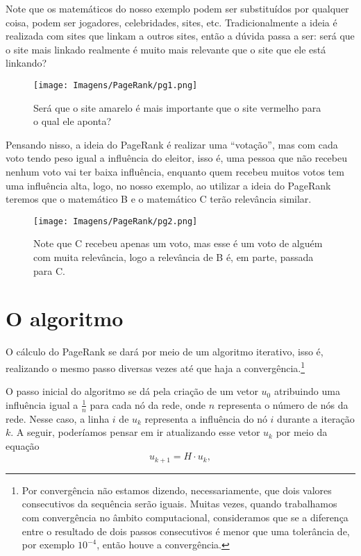 \documentclass{article}
\begin{document}
Note que os matemáticos do nosso exemplo podem ser substituídos por qualquer coisa, podem ser jogadores, celebridades, sites, etc. Tradicionalmente a ideia é realizada com sites que linkam a outros sites, então a dúvida passa a ser: será que o site mais linkado realmente é muito mais relevante que o site que ele está linkando?
\begin{figure}[H]
    \centering
    \texttt{[image: Imagens/PageRank/pg1.png]}
    \caption{Será que o site amarelo é mais importante que o site vermelho para o qual ele aponta?}
\end{figure}

Pensando nisso, a ideia do PageRank é realizar uma ``votação'', mas com cada voto tendo peso igual a influência do eleitor, isso é, uma pessoa que não recebeu nenhum voto vai ter baixa influência, enquanto quem recebeu muitos votos tem uma influência alta, logo, no nosso exemplo, ao utilizar a ideia do PageRank teremos que o matemático B e o matemático C terão relevância similar.
\begin{figure}[H]
    \centering
    \texttt{[image: Imagens/PageRank/pg2.png]}
    \caption{Note que C recebeu apenas um voto, mas esse é um voto de alguém com muita relevância, logo a relevância de B é, em parte, passada para C.}
\end{figure}

\section{O algoritmo}

O cálculo do PageRank se dará por meio de um algoritmo iterativo, isso é, realizando o mesmo passo diversas vezes até que haja a convergência.\footnote{Por convergência não estamos dizendo, necessariamente, que dois valores consecutivos da sequência serão iguais. Muitas vezes, quando trabalhamos com convergência no âmbito computacional, consideramos que se a diferença entre o resultado de dois passos consecutivos é menor que uma tolerância de, por exemplo $10^{-4}$, então houve a convergência.}

O passo inicial do algoritmo se dá pela criação de um vetor $u_0$ atribuindo uma influência igual a $\frac{1}{n}$ para cada nó da rede, onde $n$ representa o número de nós da rede. Nesse caso, a linha $i$ de $u_k$ representa a influência do nó $i$ durante a iteração $k$. A seguir, poderíamos pensar em ir atualizando esse vetor $u_k$ por meio da equação
\[u_{k + 1} = H\cdot u_k,\]
\end{document}
